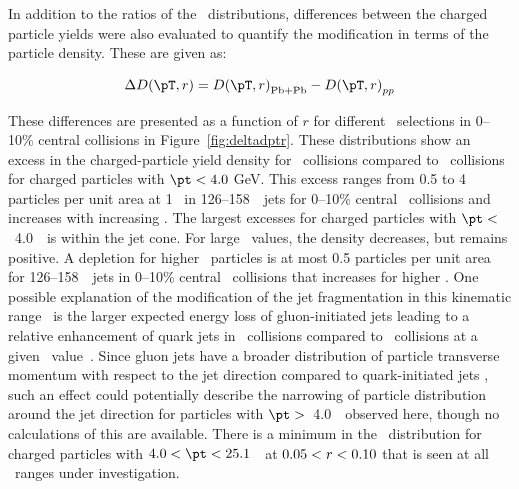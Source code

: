 In addition to the ratios of the \Dptr\ distributions, differences between the charged particle yields were also evaluated to quantify the modification in terms of the particle density. These are given as:

\begin{align}
\DeltaDptr = \Dptr_{\mathrm{Pb+Pb}} - \Dptr_{pp}
\end{align}

These differences are presented as a function of $r$ for different \pt\ selections in 0--10\% central collisions in Figure~\ref{fig:deltadptr}. 
These distributions show an excess  in the charged-particle yield density for \pbpb\ collisions compared to \pp\ collisions for charged particles with $\pt <4.0$ GeV. This excess ranges from 0.5 to 4 particles per unit area at 1 \GeV\ in 126--158~\GeV\ jets for 0--10\% central \pbpb\ collisions and increases with increasing \ptjet. 
The largest excesses for charged particles with $\pt <$~4.0~\GeV\ is within the jet cone.  For large \rvar\ values, the
density decreases, but remains positive.
A depletion for higher \pt\ particles is at most 0.5 particles per unit area for 126--158~\GeV\ jets in 0--10\% central \pbpb\ collisions that increases for higher \ptjet. 
One possible explanation of the modification of the 
jet fragmentation in this kinematic range~\cite{Aaboud:2018hpb} is the larger expected energy loss
of gluon-initiated jets leading to a relative enhancement of quark jets in \pbpb\ collisions compared
to \pp\ collisions at a given \ptjet\ value~\cite{Spousta:2015fca}. Since gluon jets have a broader distribution of particle transverse momentum with respect to the jet direction compared to quark-initiated jets \cite{OPAL:1995ab}
 , such an effect could potentially describe the narrowing of particle distribution around the jet direction for particles with $\pt >$~4.0~\GeV\
observed here, though no calculations of this are available.
There is a minimum in the \DeltaDptr\ distribution for charged particles with \mbox{$ 4.0 < \pt <  25.1$}~\GeV\ at $0.05 < \mbox{$r$} < 0.10$ that is seen at all \ptjet\ ranges under investigation.

